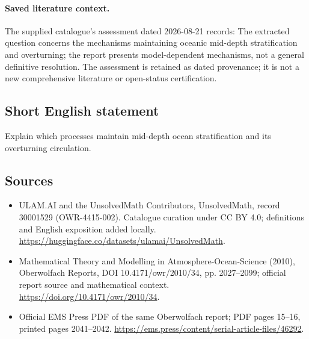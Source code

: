 \documentclass[11pt]{article}
\begin{document}
\paragraph{Saved literature context.} The supplied catalogue's assessment dated 2026-08-21 records: The extracted question concerns the mechanisms maintaining oceanic mid-depth stratification and overturning; the report presents model-dependent mechanisms, not a general definitive resolution. The assessment is retained as dated provenance; it is not a new comprehensive literature or open-status certification.
\subsection{Short English statement}
Explain which processes maintain mid-depth ocean stratification and its overturning circulation.
\subsection{Sources}
\begin{itemize}
\item[\hypertarget{source:30001529:1}{S1}] ULAM.AI and the UnsolvedMath Contributors, UnsolvedMath, record 30001529 (OWR-4415-002). Catalogue curation under CC BY 4.0; definitions and English exposition added locally.
\url{https://huggingface.co/datasets/ulamai/UnsolvedMath}.
\item[\hypertarget{source:30001529:2}{S2}] Mathematical Theory and Modelling in Atmosphere-Ocean-Science (2010), Oberwolfach Reports, DOI 10.4171/owr/2010/34, pp. 2027--2099; official report source and mathematical context.
\url{https://doi.org/10.4171/owr/2010/34}.
\item[\hypertarget{source:30001529:3}{S3}] Official EMS Press PDF of the same Oberwolfach report; PDF pages 15--16, printed pages 2041--2042.
\url{https://ems.press/content/serial-article-files/46292}.
\end{itemize}
\label{end:30001529}
\end{document}
